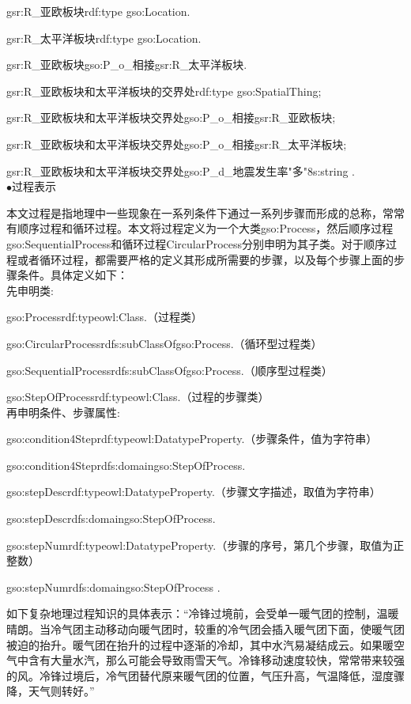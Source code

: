 gsr:R\_亚欧板块\quad rdf:type \quad gso:Location\quad .

gsr:R\_太平洋板块\quad rdf:type \quad gso:Location\quad .

gsr:R\_亚欧板块\quad gso:P\_o\_相接\quad gsr:R\_太平洋板块\quad .

gsr:R\_亚欧板块和太平洋板块的交界处\quad rdf:type \quad gso:SpatialThing\quad ;\quad 

gsr:R\_亚欧板块和太平洋板块交界处\quad gso:P\_o\_相接\quad gsr:R\_亚欧板块\quad ;

gsr:R\_亚欧板块和太平洋板块交界处\quad gso:P\_o\_相接\quad gsr:R\_太平洋板块\quad ;

gsr:R\_亚欧板块和太平洋板块交界处\quad gso:P\_d\_地震发生率\quad "多"^^xs:string .
\\

$\bullet$过程表示

本文过程是指地理中一些现象在一系列条件下通过一系列步骤而形成的总称，常常有顺序过程和循环过程。本文将过程定义为一个大类gso:Process，然后顺序过程gso:SequentialProcess和循环过程CircularProcess分别申明为其子类。对于顺序过程或者循环过程，都需要严格的定义其形成所需要的步骤，以及每个步骤上面的步骤条件。具体定义如下：\\
先申明类:

gso:Process\quad rdf:type\quad owl:Class\quad .\quad （过程类）

gso:CircularProcess\quad rdfs:subClassOf\quad gso:Process\quad .（循环型过程类）

gso:SequentialProcess\quad rdfs:subClassOf\quad gso:Process\quad .\quad （顺序型过程类）

gso:StepOfProcess\quad rdf:type\quad owl:Class\quad .（过程的步骤类）
\\
再申明条件、步骤属性:

gso:condition4Step\quad rdf:type\quad owl:DatatypeProperty\quad .\quad （步骤条件，值为字符串）

gso:condition4Step\quad rdfs:domain\quad gso:StepOfProcess\quad .

gso:stepDesc\quad rdf:type\quad owl:DatatypeProperty\quad .\quad （步骤文字描述，取值为字符串）

gso:stepDesc\quad rdfs:domain\quad gso:StepOfProcess\quad .

gso:stepNum\quad rdf:type\quad owl:DatatypeProperty\quad .\quad （步骤的序号，第几个步骤，取值为正整数）

gso:stepNum\quad rdfs:domain\quad gso:StepOfProcess .

如下复杂地理过程知识的具体表示：“冷锋过境前，会受单一暖气团的控制，温暖晴朗。当冷气团主动移动向暖气团时，较重的冷气团会插入暖气团下面，使暖气团被迫的抬升。暖气团在抬升的过程中逐渐的冷却，其中水汽易凝结成云。如果暖空气中含有大量水汽，那么可能会导致雨雪天气。冷锋移动速度较快，常常带来较强的风。冷锋过境后，冷气团替代原来暖气团的位置，气压升高，气温降低，湿度骤降，天气则转好。”

